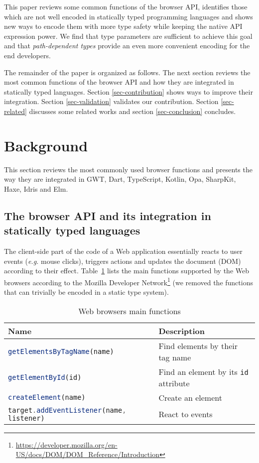 \documentclass{llncs}
\newcommand{\jscode}[1]{\lstinline[language=JavaScript]|#1|}
\begin{document}
This paper reviews some common functions of the browser API, identifies those which are not well encoded in statically typed programming languages and shows new ways to encode them with more type safety while keeping the native API expression power. We find that type parameters are sufficient to achieve this goal and that \emph{path-dependent types} provide an even more convenient encoding for the end developers.

The remainder of the paper is organized as follows. The next section reviews the most common functions of the browser API and how they are integrated in statically typed languages. Section \ref{sec-contribution} shows ways to improve their integration. Section \ref{sec-validation} validates our contribution. Section \ref{sec-related} discusses some related works and section \ref{sec-conclusion} concludes.

\section{Background}
\label{sec-background}

This section reviews the most commonly used browser functions and presents the way they are integrated in GWT, Dart, TypeScript, Kotlin, Opa, SharpKit, Haxe, Idris and Elm.

\subsection{The browser API and its integration in statically typed languages}

The client-side part of the code of a Web application essentially reacts to user events (\emph{e.g.} mouse clicks), triggers actions and updates the document (DOM) according to their effect. Table~\ref{table-dom-api} lists the main functions supported by the Web browsers according to the Mozilla Developer Network\footnote{\href{https://developer.mozilla.org/en-US/docs/DOM/DOM\_Reference/Introduction}{https://developer.mozilla.org/en-US/docs/DOM/DOM\_Reference/Introduction}} (we removed the functions that can trivially be encoded in a static type system).

\begin{table}
 \centering
 \begin{tabular}{ll}
  \hline
  Name & Description \\
  \hline
  \jscode{getElementsByTagName(name)} & Find elements by their tag name \\
  \jscode{getElementById(id)} & Find an element by its \jscode{id} attribute \\
  \jscode{createElement(name)} & Create an element \\
  \jscode{target.addEventListener(name, listener)} & React to events \\
  \hline
 \end{tabular}

 \label{table-dom-api}
 \caption{Web browsers main functions}
\end{table}
\end{document}

